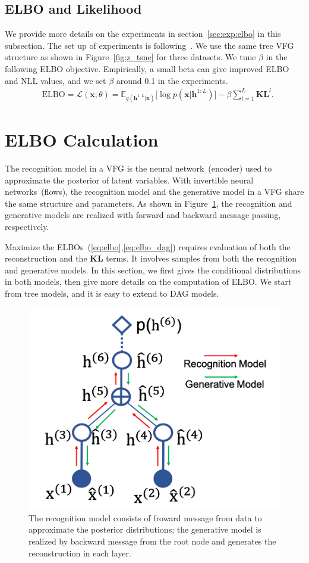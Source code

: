 \documentclass[twoside]{article}
\begin{document}
\subsection{ELBO and Likelihood}
We provide more details on the experiments in section~\ref{sec:exp:elbo} in this subsection.  The  set up of experiments is following~\cite{berg2018sylvester}. We use the same tree VFG structure as shown in Figure~\ref{fig:z_tsne} for three datasets. We tune $\beta$ in the following ELBO objective. Empirically, a small beta can give improved ELBO and NLL values, and we set $\beta$ around 0.1 in the experiments. 
\begin{align*} %
&\text{ELBO}= \mathcal{L}(\mathbf{x}; \theta) 
    = \mathbb{E}_{q(\mathbf{h}^{1:L}|\mathbf{x})}\big[ \log p(\mathbf{x}|\mathbf{h}^{1:L})  \big] - \beta\sum_{l=1}^{L} \mathbf{KL}^l.
\end{align*}%


\section{ELBO Calculation}\label{sec:elbo_cal_supp}
The recognition model in a VFG is the neural network~(encoder) used to approximate the posterior of latent variables. 
With invertible neural networks~(flows), the recognition model and the generative model in a VFG share the same structure and parameters.  As shown in Figure~\ref{fig:tree_message2},    the recognition and generative models are realized with  forward and backward message passing, respectively.

Maximize the ELBOs~(\ref{eq:elbo},\ref{eq:elbo_dag}) requires evaluation of both the reconstruction and the $\mathbf{KL}$ terms. It involves samples from both the recognition and generative models. In this section, we first gives the conditional distributions in both   models, then give more details on the computation of ELBO. We start from tree models, and it is easy to extend to DAG models.


\begin{figure}[H]
\begin{center}
 \includegraphics[width=0.4\linewidth]{fig/tree_message2.png}
\end{center}
\vspace{-0.2in}
\caption{ The recognition model consists of froward message from  data to approximate the posterior distributions; the generative model is realized by backward message from the root node and generates the reconstruction in each layer. }
\label{fig:tree_message2}
\vspace{-0.15in}
\end{figure}
\end{document}
